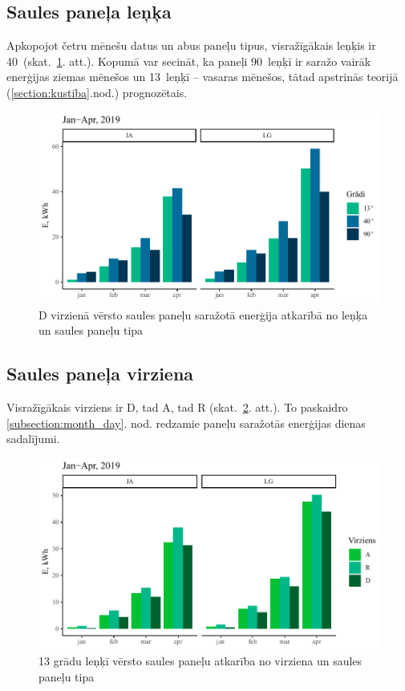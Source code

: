 \subsection{Saules paneļa leņķa}\label{subsection:degree}
Apkopojot četru mēnešu datus un abus paneļu tipus, visražīgākais leņķis ir 40\textdegree ~(skat.~\ref{fig:lg_ja_deg}. att.).
Kopumā var secināt, ka paneļi 90\textdegree ~leņķī ir saražo vairāk enerģijas ziemas mēnešos un 13\textdegree ~leņķī -- vasaras mēnešos, tātad apstrinās teorijā (\ref{section:kustiba}.nod.) prognozētais.
\begin{figure}[h]
    \centering
    \includegraphics[width=\linewidth]{figures/results/all_degType.pdf}
    \caption{D virzienā vērsto saules paneļu saražotā enerģija atkarībā no leņķa un saules paneļu tipa} \label{fig:lg_ja_deg}
\end{figure}


\subsection{Saules paneļa virziena}\label{subsection:dir}
Visražīgākais virziens ir D, tad A, tad R (skat.~\ref{fig:lg_ja_dir}. att.). To paskaidro \ref{subsection:month_day}. nod. redzamie paneļu saražotās enerģijas dienas sadalījumi.
\begin{figure}[h]
    \centering
    \includegraphics[width=\linewidth]{figures/results/all_dirType.pdf}
    \caption{13 grādu leņķī vērsto saules paneļu atkarība no virziena un saules paneļu tipa}
    \label{fig:lg_ja_dir}
\end{figure}

